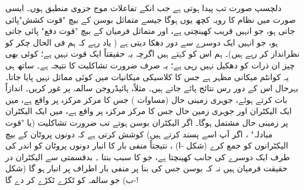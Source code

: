 دلچسپ صورت تب پیدا ہوتی ہے جب انکے  تفاعلات موج   جزوی منطبق ہوں۔ ایسی صورت میں نظام کا رویہ کچھ یوں ہوگا جیسے متماثل بوسن کے بیچ  "قوت کشش"پائی جاتی ہو،  جو انہیں قریب کھینچتی ہے،  اور  متماثل فرمیان کے بیچ "قوت دفع" پائی  جاتی ہو،  جو انہیں ایک دوسرے سے دور دھکا  دیتی  ہے ( یاد رہے کہ ہم فی الحال چکر کو نظرانداز کر رہے ہیں)۔ ہم اس کو   کہتے ہیں اگرچہ یہ حقیقتاً ایک قوت نہیں ہے؛ کوئی بھی چیز ان ذرات کو دھکیل نہیں رہی ہے؛  یہ صرف ضرورت تشاکلیت کا   نتیجہ ہے۔  ساتھ ہی یہ کوانٹم میکانی مظہر ہے جس کا کلاسیکی میکانیات میں کوئی مماثل نہیں پایا جاتا۔ بہرحال اس کے دور رس  نتائج پائے جاتے ہیں۔ مثلاً،  ہائیڈروجن سالمہ  پر غور کریں۔ اندازاً بات کرتے ہوئے،  جوہری زمینی حال   (مساوات )   جس کا مرکز مرکزہ  پر واقع ہے، میں ایک الیکٹران اور  جوہری زمین حال جس کا مرکز مرکزہ  پر واقع ہے،   میں ایک الیکٹران  پر زمینی حال مشتمل ہوگا۔ اگر الیکٹران بوسن ہوتے تب ضرورت تشاکلیت  (یا  "قوت مبادلہ" ، اگر آپ اسے پسند کرتے ہیں) کوشش کرتی ہے کہ دونوں پروٹان کے بیچ الیکٹرانوں کو جمع کرے
 (شکل -ا)  ، نتیجتاً منفی بار کا انبار دونوں پروٹان کو اندر کی طرف ایک دوسرے کی جانب کھینچتا ہے،  جو  کا سبب بنتا ۔  بدقسمتی سے  الیکٹران  در حقیقت  فرمیان ہیں نہ کہ بوسن جس کی بنا    پر منفی بار   اطراف پر انبار  ہو گا   (شکل -ب)   جو سالمہ کو  ٹکڑے ٹکڑے کر دے  گا!

